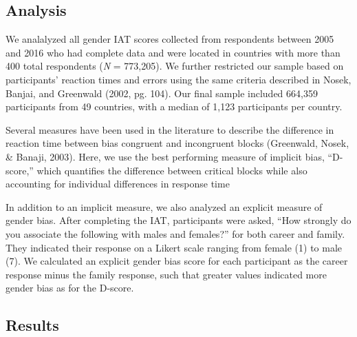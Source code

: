 \documentclass[10pt, letterpaper]{article}
\begin{document}
\subsection{Analysis}\label{analysis}

We analalyzed all gender IAT scores collected from respondents between
2005 and 2016 who had complete data and were located in countries with
more than 400 total respondents (\emph{N} = 773,205). We further
restricted our sample based on participants' reaction times and errors
using the same criteria described in Nosek, Banjai, and Greenwald (2002,
pg. 104). Our final sample included 664,359 participants from 49
countries, with a median of 1,123 participants per country.

Several measures have been used in the literature to describe the
difference in reaction time between bias congruent and incongruent
blocks (Greenwald, Nosek, \& Banaji, 2003). Here, we use the best
performing measure of implicit bias, ``D-score,'' which quantifies the
difference between critical blocks while also accounting for individual
differences in response time

In addition to an implicit measure, we also analyzed an explicit measure
of gender bias. After completing the IAT, participants were asked, ``How
strongly do you associate the following with males and females?'' for
both career and family. They indicated their response on a Likert scale
ranging from female (1) to male (7). We calculated an explicit gender
bias score for each participant as the career response minus the family
response, such that greater values indicated more gender bias as for the
D-score.

\subsection{Results}\label{results}
\end{document}

